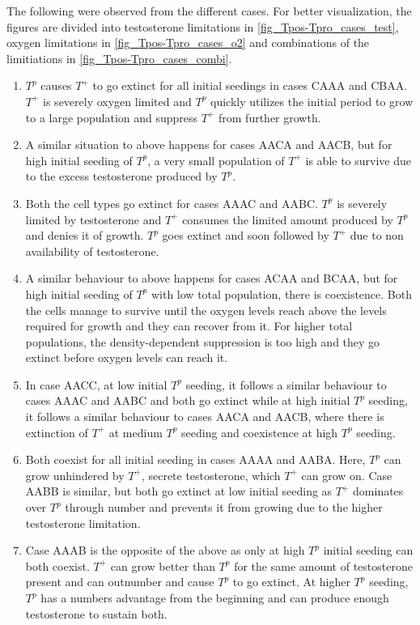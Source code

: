 The following were observed from the different cases. For better visualization, the figures are divided into testosterone limitations in \autoref{fig_Tpos-Tpro_cases_test}, oxygen limitations in \autoref{fig_Tpos-Tpro_cases_o2} and combinations of the limitiations in \autoref{fig_Tpos-Tpro_cases_combi}.
\begin{enumerate}
  \item $T^p$ causes $T^+$ to go extinct for all initial seedings in cases CAAA and CBAA. $T^+$ is severely oxygen limited and $T^p$ quickly utilizes the initial period to grow to a large population and suppress $T^+$ from further growth.
  \item A similar situation to above happens for cases AACA and AACB, but for high initial seeding of $T^p$, a very small population of $T^+$ is able to survive due to the excess testosterone produced by $T^p$.
  \item Both the cell types go extinct for cases AAAC and AABC. $T^p$ is severely limited by testosterone and $T^+$ consumes the limited amount produced by $T^p$ and denies it of growth. $T^p$ goes extinct and soon followed by $T^+$ due to non availability of testosterone.
  \item A similar behaviour to above happens for cases ACAA and BCAA, but for high initial seeding of $T^p$ with low total population, there is coexistence. Both the cells manage to survive until the oxygen levels reach above the levels required for growth and they can recover from it. For higher total populations, the density-dependent suppression is too high and they go extinct before oxygen levels can reach it.
  \item In case AACC, at low initial $T^p$ seeding, it follows a similar behaviour to cases AAAC and AABC and both go extinct while at high initial $T^p$ seeding, it follows a similar behaviour to cases AACA and AACB, where there is extinction of $T^+$ at medium $T^p$ seeding and coexistence at high $T^p$ seeding.
  \item Both coexist for all initial seeding in cases AAAA and AABA. Here, $T^p$ can grow unhindered by $T^+$, secrete testosterone, which $T^+$ can grow on. Case AABB is similar, but both go extinct at low initial seeding as $T^+$ dominates over $T^p$ through number and prevents it from growing due to the higher testosterone limitation.
  \item Case AAAB is the opposite of the above as only at high $T^p$ initial seeding can both coexist. $T^+$ can grow better than $T^p$ for the same amount of testosterone present and can outnumber and cause $T^p$ to go extinct. At higher $T^p$ seeding, $T^p$ has a numbers advantage from the beginning and can produce enough testosterone to sustain both.

\end{enumerate}
